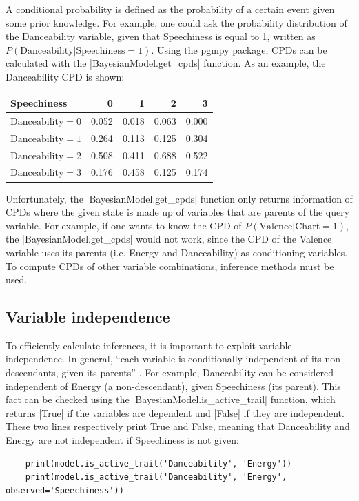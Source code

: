\documentclass[a4paper, 12pt]{article}
\begin{document}
A conditional probability is defined as the probability of a certain event given some prior knowledge. For example, one could ask the probability distribution of the Danceability variable, given that Speechiness is equal to 1, written as $P\left(\mathrm{Danceability} | \mathrm{Speechiness} = 1\right)$. Using the pgmpy package, CPDs can be calculated with the \spverb|BayesianModel.get_cpds| function. As an example, the Danceability CPD is shown:
\begin{center}
    \begin{tabular}{lrrrr}
        \toprule
        Speechiness                 & 0     & 1     & 2     & 3     \\
        \midrule
        $\mathrm{Danceability} = 0$ & 0.052 & 0.018 & 0.063 & 0.000 \\
        $\mathrm{Danceability} = 1$ & 0.264 & 0.113 & 0.125 & 0.304 \\
        $\mathrm{Danceability} = 2$ & 0.508 & 0.411 & 0.688 & 0.522 \\
        $\mathrm{Danceability} = 3$ & 0.176 & 0.458 & 0.125 & 0.174 \\
        \bottomrule
    \end{tabular}
\end{center}

Unfortunately, the \spverb|BayesianModel.get_cpds| function only returns information of CPDs where the given state is made up of variables that are parents of the query variable. For example, if one wants to know the CPD of $P\left(\mathrm{Valence} | \mathrm{Chart} = 1\right)$, the \spverb|BayesianModel.get_cpds| would not work, since the CPD of the Valence variable uses its parents (i.e. Energy and Danceability) as conditioning variables. To compute CPDs of other variable combinations, inference methods must be used.


\subsection{Variable independence}

To efficiently calculate inferences, it is important to exploit variable independence. In general, ``each variable is conditionally independent of its non-descendants, given its parents'' \cite{probabilistic-reasoning}. For example, Danceability can be considered independent of Energy (a non-descendant), given Speechiness (its parent). This fact can be checked using the \spverb|BayesianModel.is_active_trail| function, which returns \spverb|True| if the variables are dependent and \spverb|False| if they are independent. These two lines respectively print True and False, meaning that Danceability and Energy are not independent if Speechiness is not given:
\begin{verbatim}
    print(model.is_active_trail('Danceability', 'Energy'))
    print(model.is_active_trail('Danceability', 'Energy', observed='Speechiness'))
\end{verbatim}
\end{document}

